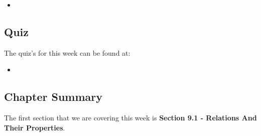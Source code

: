 \begin{itemize}
    \item {}
\end{itemize}

\subsection{Quiz}

The quiz's for this week can be found at:

\begin{itemize}
    \item {}
\end{itemize}

\subsection{Chapter Summary}

The first section that we are covering this week is \textbf{Section 9.1 - Relations And Their Properties}.

